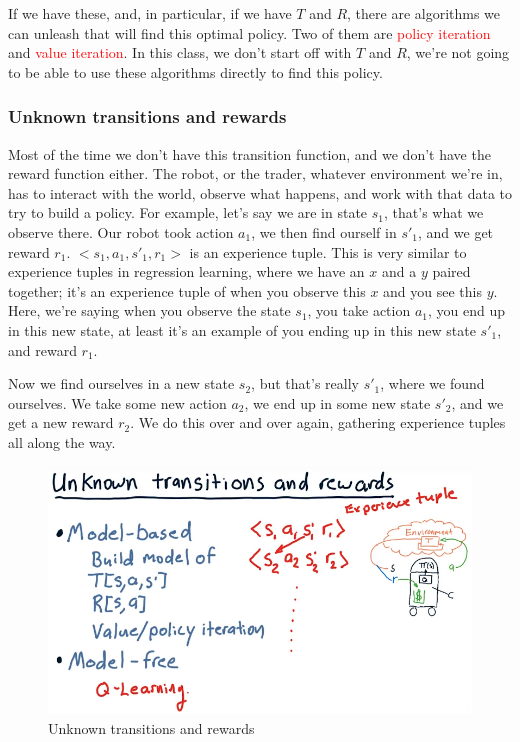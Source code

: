 \documentclass[12pt]{article}
\begin{document}
If we have these, and, in particular, if we have $T$ and $R$, there are algorithms we can unleash that will find this optimal policy. Two of them are \textcolor{red}{policy iteration} and \textcolor{red}{value iteration}. In this class, we don't start off with $T$ and $R$, we're not going to be able to use these algorithms directly to find this policy. 

\subsubsection{Unknown transitions and rewards}

Most of the time we don't have this transition function, and we don't have the reward function either. The robot, or the trader, whatever environment we're in, has to interact with the world, observe what happens, and work with that data to try to build a policy. For example, let's say we are in state $s_1$, that's what we observe there. Our robot took action $a_1$, we then find ourself in $s'_1$, and we get reward $r_1$. $<s_1, a_1, s'_1, r_1>$ is an experience tuple. This is very similar to experience tuples in regression learning, where we have an $x$ and a $y$ paired together; it's an experience tuple of when you observe this $x$ and you see this $y$. Here, we're saying when you observe the state $s_1$, you take action $a_1$, you end up in this new state, at least it's an example of you ending up in this new state $s'_1$, and reward $r_1$. 

Now we find ourselves in a new state $s_2$, but that's really $s'_1$, where we found ourselves. We take some new action $a_2$, we end up in some new state $s'_2$, and we get a new reward $r_2$. We do this over and over again, gathering experience tuples all along the way. 

\begin{figure}[!ht]
\centering
\includegraphics[scale=0.42]{fig/fig101}
\caption{Unknown transitions and rewards}
\end{figure}
\end{document}
